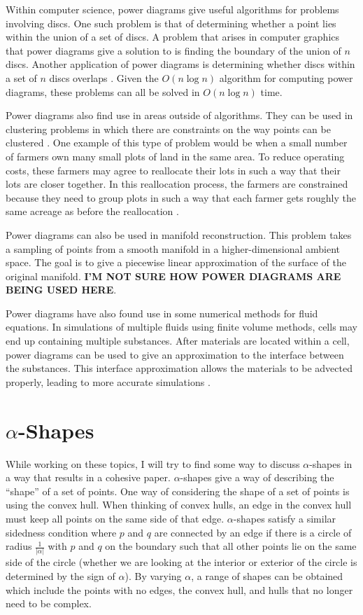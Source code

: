 \documentclass[a4paper]{article}
\begin{document}
Within computer science, power diagrams give useful algorithms for problems involving discs. One such problem is that of determining whether a point
lies within the union of a set of discs. A problem that arises in computer graphics that power diagrams give a solution to is finding the boundary of
the union of $n$ discs. \cite{imai_power} Another application of power diagrams is determining whether discs within a set of $n$ discs overlaps
\cite{aurenhammer_discs}. Given the $O(n \log n)$ algorithm for computing power diagrams, these problems can all be solved in $O(n \log n)$ time.

Power diagrams also find use in areas outside of algorithms. They can be used in clustering problems in which there are constraints on the way points
can be clustered \cite{brieden_clustering}. One example of this type of problem would be when a small number of farmers own many small plots of land
in the same area. To reduce operating costs, these farmers may agree to reallocate their lots in such a way that their lots are closer together. In
this reallocation process, the farmers are constrained because they need to group plots in such a way that each farmer gets roughly the same acreage
as before the reallocation \cite{brieden_farmland}.

Power diagrams can also be used in manifold reconstruction. This problem takes a sampling of points from a smooth manifold in a higher-dimensional
ambient space. The goal is to give a piecewise linear approximation of the surface of the original manifold. \textbf{I'M NOT SURE HOW POWER DIAGRAMS
ARE BEING USED HERE}.

Power diagrams have also found use in some numerical methods for fluid equations. In simulations of multiple fluids using finite volume methods, cells
may end up containing multiple substances. After materials are located within a cell, power diagrams can be used to give an approximation to the
interface between the substances. This interface approximation allows the materials to be advected properly, leading to more accurate simulations
\cite{fluids}.

\section{$\alpha$-Shapes}

While working on these topics, I will try to find some way to discuss $\alpha$-shapes in a way that results in a cohesive paper. $\alpha$-shapes give
a way of describing the ``shape'' of a set of points. One way of considering the shape of a set of points is using the convex hull. When thinking of
convex hulls, an edge in the convex hull must keep all points on the same side of that edge. $\alpha$-shapes satisfy a similar sidedness condition
where $p$ and $q$ are connected by an edge if there is a circle of radius $\frac{1}{|\alpha|}$ with $p$ and $q$ on the boundary such that all other
points lie on the same side of the circle (whether we are looking at the interior or exterior of the circle is determined by the sign of $\alpha$). By
varying $\alpha$, a range of shapes can be obtained which include the points with no edges, the convex hull, and hulls that no longer need to be
complex.
\end{document}
